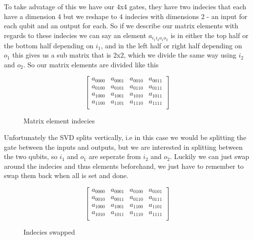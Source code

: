 To take advatage of this we have our 4x4 gates, they have two indecies that each have a dimension 4 but we reshape to 4 indecies with dimensions 2 - an input for each qubit and an output for each. So if we describe our matrix elements with regards to these indecies we can say an element $a_{i_1i_2o_1o_2}$ is in either the top half or the bottom half depending on $i_1$, and in the left half or right half depending on $o_1$ this gives us a sub matrix that is 2x2, which we divide the same way using $i_2$ and $o_2$. So our matrix elements are divided like this 
\begin{figure}[H]
    $$
    \begin{bmatrix}
        a_{0000} & a_{0001} & a_{0010} & a_{0011}\\
        a_{0100} & a_{0101} & a_{0110} & a_{0111}\\
        a_{1000} & a_{1001} & a_{1010} & a_{1011}\\
        a_{1100} & a_{1101} & a_{1110} & a_{1111}\\
    \end{bmatrix}
    $$
    \caption{Matrix element indecies}
    \label{fig:matrix_indecies}
\end{figure}
\noindent
Unfortunately the SVD splits vertically, i.e in this case we would be splitting the gate between the inputs and outputs, but we are interested in splitting between the two qubits, so $i_1$ and $o_1$ are seperate from $i_2$ and $o_2$. Luckily we can just swap around the indecies and thus elements beforehand, we just have to remember to swap them back when all is set and done. 
\begin{figure}[H]
    $$
    \begin{bmatrix}
        a_{0000} & a_{0001} & a_{0100} & a_{0101}\\
        a_{0010} & a_{0011} & a_{0110} & a_{0111}\\
        a_{1000} & a_{1001} & a_{1100} & a_{1101}\\
        a_{1010} & a_{1011} & a_{1110} & a_{1111}\\
    \end{bmatrix}
    $$
    \caption{Indecies swapped}
    \label{fig:matrix_swapped}
\end{figure}

